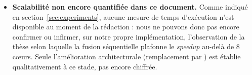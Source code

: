 \begin{itemize}
        n'affecte pas la validité de l'algorithme, seulement la possibilité
        de l'exercer via ce test précis sur cette machine précise.
  \item \textbf{Scalabilité non encore quantifiée dans ce document.} Comme
        indiqué en section~\ref{sec:experiments}, aucune mesure de temps
        d'exécution n'est disponible au moment de la rédaction : nous ne
        pouvons donc pas encore confirmer ou infirmer, sur notre propre
        implémentation, l'observation de la thèse selon laquelle la fusion
        séquentielle plafonne le \emph{speedup} au-delà de 8 cœurs. Seule
        l'amélioration architecturale (remplacement par )
        est établie qualitativement à ce stade, pas encore chiffrée.
\end{itemize}
